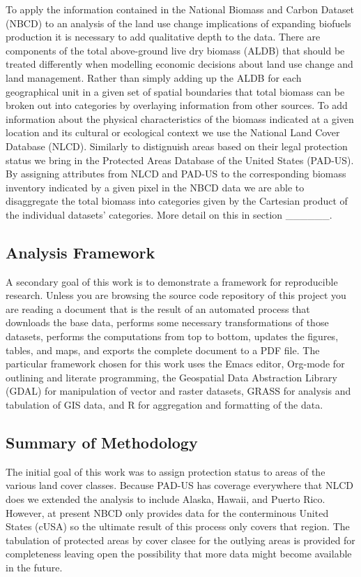 \documentclass[11pt]{article}
\begin{document}
To apply the information contained in the National Biomass and Carbon
Dataset (NBCD) to an analysis of the land use change implications of
expanding biofuels production it is necessary to add qualitative depth
to the data.  There are components of the total above-ground live dry
biomass (ALDB) that should be treated differently when modelling
economic decisions about land use change and land management.  Rather
than simply adding up the ALDB for each geographical unit in a given
set of spatial boundaries that total biomass can be broken out into
categories by overlaying information from other sources.  To add
information about the physical characteristics of the biomass
indicated at a given location and its cultural or ecological context
we use the National Land Cover Database (NLCD).  Similarly to
distignuish areas based on their legal protection status we bring in
the Protected Areas Database of the United States (PAD-US). By
assigning attributes from NLCD and PAD-US to the corresponding biomass
inventory indicated by a given pixel in the NBCD data we are able to
disaggregate the total biomass into categories given by the Cartesian
product of the individual datasets' categories. More detail on this in
section ______.
\subsection{Analysis Framework}
\label{sec-1-3}


A secondary goal of this work is to demonstrate a framework for
reproducible research.  Unless you are browsing the source code
repository of this project you are reading a document that is the
result of an automated process that downloads the base data, performs
some necessary transformations of those datasets, performs the
computations from top to bottom, updates the figures, tables, and
maps, and exports the complete document to a PDF file.  The particular
framework chosen for this work uses the Emacs editor, Org-mode for
outlining and literate programming, the Geospatial Data Abstraction
Library (GDAL) for manipulation of vector and raster datasets, GRASS
for analysis and tabulation of GIS data, and R for aggregation and
formatting of the data. 
\subsection{Summary of Methodology}
\label{sec-1-4}


The initial goal of this work was to assign protection status to areas
of the various land cover classes.  Because PAD-US has coverage
everywhere that NLCD does we extended the analysis to include Alaska,
Hawaii, and Puerto Rico.  However, at present NBCD only provides data
for the conterminous United States (cUSA) so the ultimate result of
this process only covers that region.  The tabulation of protected
areas by cover clasee for the outlying areas is provided for
completeness leaving open the possibility that more data might become
available in the future.
\end{document}
